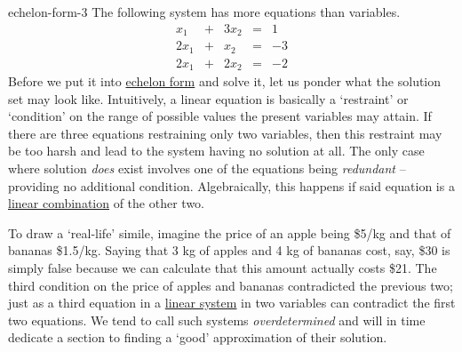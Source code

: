 \begin{example}{}{echelon-form-3}
 The following system has more equations than variables.
 \begin{equation}
  \label{eq:overdetermined-system}
  \begin{array}{rcrcr}
    x_1 & + & 3x_2 & = & 1\\
    2x_1 & + & x_2 & = & -3\\
    2x_1 & + & 2x_2 & = & -2
  \end{array}
 \end{equation}
 Before we put it into \hyperref[def:echelon-form]{echelon form} and solve it,
 let us ponder what the solution set may look like. Intuitively, a linear
 equation is basically a `restraint' or `condition' on the range of possible
 values the present variables may attain. If there are three equations
 restraining only two variables, then this restraint may be too harsh and lead
 to the system having no solution at all. The only case where solution
 \emph{does} exist involves one of the equations being \emph{redundant} --
 providing no additional condition. Algebraically, this happens if said equation
 is a \hyperref[def:linear-combination]{linear combination} of the other two.

 To draw a `real-life' simile, imagine the price of an apple being \$5/kg and
 that of bananas \$1.5/kg. Saying that 3 kg of apples and 4 kg of bananas cost,
 say, \$30 is simply false because we can calculate that this amount actually
 costs \$21. The third condition on the price of apples and bananas contradicted
 the previous two; just as a third equation in a
 \hyperref[def:linear-system]{linear system} in two variables can contradict the
 first two equations. We tend to call such systems \emph{overdetermined} and
 will in time dedicate a section to finding a `good' approximation of their
 solution.


\end{example}
